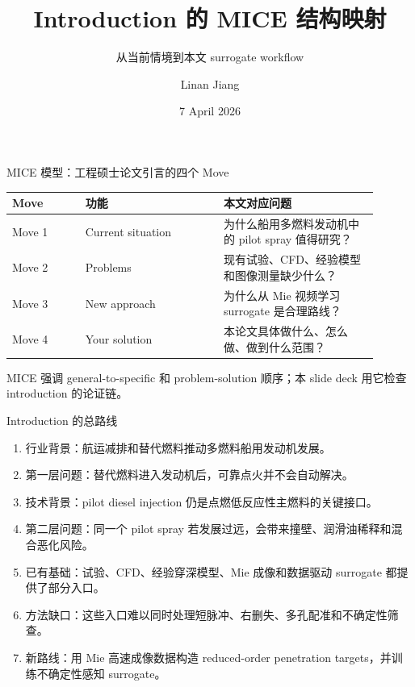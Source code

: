 \documentclass[aspectratio=169,11pt]{beamer}
\title[MICE Introduction Map]{Introduction 的 MICE 结构映射}
\subtitle{从当前情境到本文 surrogate workflow}
\author{Linan Jiang}
\institute{Aalto University}
\date{7 April 2026}
\newcommand{\claim}[1]{\textcolor{blue!65!black}{#1}}
\newcommand{\gaptext}[1]{\textcolor{red!65!black}{#1}}
\newcommand{\solutiontext}[1]{\textcolor{green!45!black}{#1}}
\begin{document}
\begin{frame}
  \titlepage
\end{frame}

\begin{frame}{MICE 模型：工程硕士论文引言的四个 Move}
\small
\begin{tabular}{L{0.18\linewidth}L{0.34\linewidth}L{0.38\linewidth}}
\toprule
Move & 功能 & 本文对应问题 \\
\midrule
Move 1 & Current situation & 为什么船用多燃料发动机中的 pilot spray 值得研究？ \\
Move 2 & Problems & 现有试验、CFD、经验模型和图像测量缺少什么？ \\
Move 3 & New approach & 为什么从 Mie 视频学习 surrogate 是合理路线？ \\
Move 4 & Your solution & 本论文具体做什么、怎么做、做到什么范围？ \\
\bottomrule
\end{tabular}

\vspace{0.7em}
\footnotesize
MICE 强调 general-to-specific 和 problem-solution 顺序；本 slide deck 用它检查 introduction 的论证链。
\end{frame}

\begin{frame}{Introduction 的总路线}
\footnotesize
\begin{enumerate}
  \item \claim{行业背景}：航运减排和替代燃料推动多燃料船用发动机发展。
  \item \gaptext{第一层问题}：替代燃料进入发动机后，可靠点火并不会自动解决。
  \item \claim{技术背景}：pilot diesel injection 仍是点燃低反应性主燃料的关键接口。
  \item \gaptext{第二层问题}：同一个 pilot spray 若发展过远，会带来撞壁、润滑油稀释和混合恶化风险。
  \item \claim{已有基础}：试验、CFD、经验穿深模型、Mie 成像和数据驱动 surrogate 都提供了部分入口。
  \item \gaptext{方法缺口}：这些入口难以同时处理短脉冲、右删失、多孔配准和不确定性筛查。
  \item \solutiontext{新路线}：用 Mie 高速成像数据构造 reduced-order penetration targets，并训练不确定性感知 surrogate。
\end{enumerate}
\end{frame}
\end{document}
